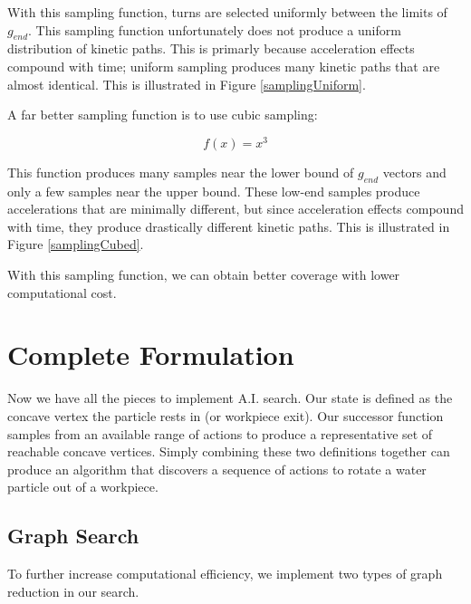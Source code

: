 With this sampling function, turns are selected uniformly between the limits of $g_{end}$. This sampling function unfortunately does not produce a uniform distribution of kinetic paths. This is primarly because acceleration effects compound with time; uniform sampling produces many kinetic paths that are almost identical. This is illustrated in Figure \ref{samplingUniform}.


A far better sampling function is to use cubic sampling:

$$
f(x) = x^3
$$

This function produces many samples near the lower bound of $g_{end}$ vectors and only a few samples near the upper bound. These low-end samples produce accelerations that are minimally different, but since acceleration effects compound with time, they produce drastically different kinetic paths. This is illustrated in Figure \ref{samplingCubed}.


With this sampling function, we can obtain better coverage with lower computational cost.

	\section{Complete Formulation}

Now we have all the pieces to implement A.I. search. Our state is defined as the concave vertex the particle rests in (or workpiece exit). Our successor function samples from an available range of actions to produce a representative set of reachable concave vertices. Simply combining these two definitions together can produce an algorithm that discovers a sequence of actions to rotate a water particle out of a workpiece.

	\subsection{Graph Search}

To further increase computational efficiency, we implement two types of graph reduction in our search.

